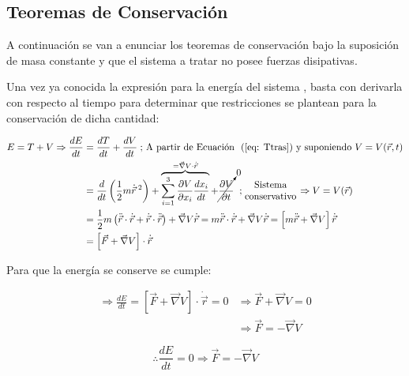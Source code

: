 \documentclass[/home/hernan/Documentos/Apuntes_mecanica_teorica/main.tex]{subfiles}
\begin{document}
	\subsection{Teoremas de Conservación}

	A continuación se van a enunciar los teoremas de conservación bajo la suposición de masa constante y que el sistema a tratar no posee fuerzas disipativas.


	\begin{theorem}
		Una vez ya conocida la expresión para la energía del sistema , basta con derivarla con respecto al tiempo para determinar que restricciones se plantean para la conservación de dicha cantidad:

		\begin{align*}
			E = T + V \Rightarrow \frac{dE}{dt} & = \frac{dT}{dt} + \frac{dV}{dt} \; \textup{; A partir de \Eqref{eq: Ttras} y suponiendo $V = V(\vec{r}, t)$}\\
												& = \frac{d}{dt} \left(\frac{1}{2} m \dot{\vec{r}}\:^{2}\right) + \overbrace{\sum_{i=1}^{3} \frac{\partial V}{\partial x_{i}} \frac{d x_{i}}{d t}}^{= \vec{\nabla}V \cdot \dot{\vec{r}}} + \cancelto{0}{\frac{\partial V}{\partial t}} \; \; ; \left .\begin{matrix}
													\textup{Sistema}\\ 
													\textup{conservativo}
													\end{matrix} \right . \Rightarrow V = V(\vec{r}) \\
												& = \frac{1}{2} m \left(\ddot{\vec{r}} \cdot \dot{\vec{r}} + \dot{\vec{r}} \cdot \ddot{\vec{r}}\right) + \vec{\nabla} V \dot{\vec{r}} 
												= m \ddot{\vec{r}} \cdot \dot{\vec{r}} + \vec{\nabla} V \dot{\vec{r}}
												= \left[m \ddot{\vec{r}} +   \vec{\nabla} V \right] \dot{\vec{r}}\\
												& = \left[\vec{F} + \vec{\nabla} V \right] \cdot \dot{\vec{r}}\\
		\end{align*}

		Para que la energía se conserve se cumple:

		\begin{align*}
			\Rightarrow \frac{dE}{dt} = \left[\vec{F} + \vec{\nabla} V \right] \cdot \dot{\vec{r}} = 0
			&\Rightarrow \vec{F} + \vec{\nabla} V = 0\\
			& \Rightarrow \vec{F} = - \vec{\nabla} V 
		\end{align*}

		\begin{equation}
			\therefore \frac{dE}{dt} = 0 \Rightarrow  \vec{F} = - \vec{\nabla} V
			\label{eq: Econs}
		\end{equation}
		
	\end{theorem}
\end{document}
